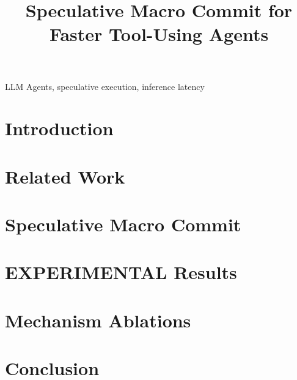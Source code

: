 \documentclass{article}
\title{Speculative Macro Commit for Faster Tool-Using Agents}
\begin{document}

\maketitle

\begin{abstract}

\end{abstract}
%
\begin{keywords}
LLM Agents, speculative execution, inference latency
\end{keywords}

\newcommand{\cem}[1]{\textcolor{blue}{cem: #1}}
%

\section{Introduction}
\label{sec:introduction}


\section{Related Work}
\label{sec:background}


\section{Speculative Macro Commit}
\label{sec:method}


\section{EXPERIMENTAL Results}
\label{sec:results}


\section{Mechanism Ablations}
\label{sec:ablations}


\section{Conclusion}
\label{sec:conclusion}





\end{document}
